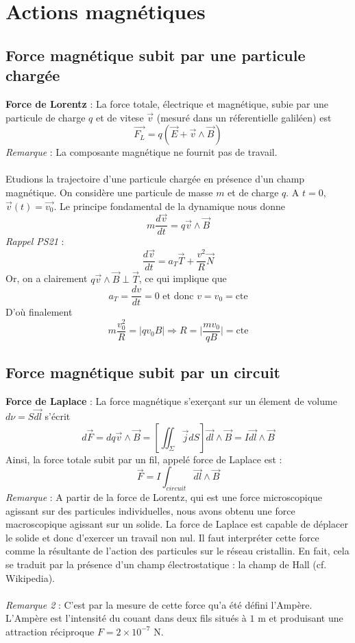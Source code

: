 \section{Actions magnétiques}
\subsection{Force magnétique subit par une particule chargée}

\noindent\textbf{Force de Lorentz} : La force totale, électrique et magnétique, subie par une particule de charge $q$ et de vitese $\vec{v}$ (mesuré dans un réferentielle galiléen) est \[ \vec{F_L}=q(\vec{E}+\vec{v}\land\vec{B}) \]
\emph{Remarque} : La composante magnétique ne fournit pas de travail.\\\\
\noindent Etudions la trajectoire d'une particule chargée en présence d'un champ magnétique. On considère une particule de masse $m$ et de charge $q$. A $t=0$, $\vec{v}(t)=\vec{v_0}$. Le principe fondamental de la dynamique nous donne
\[ m\frac{d\vec{v}}{dt}=q\vec{v}\land\vec{B} \]
\emph{Rappel PS21} : \[\frac{d\vec{v}}{dt}=a_T\vec{T}+\frac{v^2}{R}\vec{N}\]
Or, on a clairement $q\vec{v}\land\vec{B}\perp\vec{T}$, ce qui implique que
\[ a_T=\frac{dv}{dt}=0 \textrm{ et donc }v=v_0=\textrm{cte} \]
D'où finalement
\[ m\frac{v_0^2}{R}=\mid qv_0B\mid \Rightarrow R=\mid\frac{mv_0}{qB}\mid=\textrm{cte} \]

\subsection{Force magnétique subit par un circuit}

\noindent\textbf{Force de Laplace} : 
La force magnétique s'exerçant sur un élement de volume $d\nu=S\vec{dl}$ s'écrit 
\[ d\vec{F}=dq\vec{v}\land\vec{B}=\left[\iint_\Sigma\vec{j}dS\right]\vec{dl}\land\vec{B}=I \vec{dl}\land\vec{B}\]
Ainsi, la force totale subit par un fil, appelé force de Laplace est :
\[ \vec{F}=I\int_{circuit}\vec{dl}\land\vec{B} \]
\emph{Remarque} : A partir de la force de Lorentz, qui est une force microscopique agissant sur des particules individuelles, nous avons obtenu une force macroscopique agissant sur un solide. La force de Laplace est capable de déplacer le solide et donc d'exercer un travail non nul. Il faut interpréter cette force comme la résultante de l'action des particules sur le réseau cristallin. En fait, cela se traduit par la présence d'un champ électrostatique : la champ de Hall (cf. Wikipedia).\\\\
\noindent\emph{Remarque 2} : C'est par la mesure de cette force qu'a été défini l'Ampère. L'Ampère est l'intensité du couant dans deux fils situés à $1$ m et produisant une attraction réciproque $F=2\times 10^{-7}$ N.


